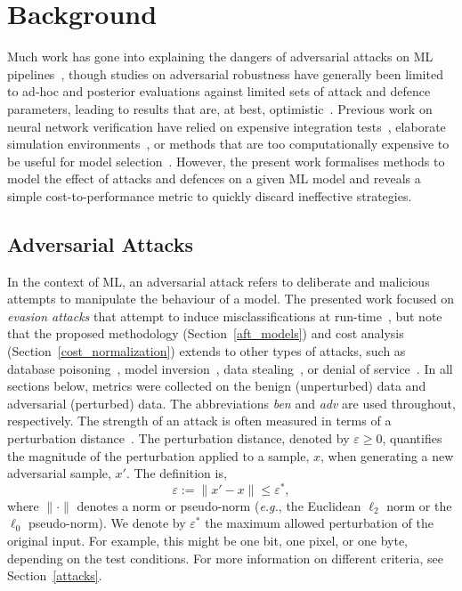 \section{Background}
Much work has gone into explaining the dangers of adversarial attacks on ML pipelines~\cite{carlini_towards_2017,pixelattack,fgm,biggio_evasion_2013}, though studies on adversarial robustness have generally been limited to ad-hoc and posterior evaluations against limited sets of attack and defence parameters, leading to results that are, at best, optimistic~\cite{meyers}.
Previous work on neural network verification have relied on expensive integration tests~\cite{vehicle_testing_review}, elaborate simulation environments~\cite{vehicle_formal}, or methods that are too computationally expensive to be useful for model selection~\cite{formal_adversarial}.
However, the present work formalises methods to model the effect of attacks and defences on a given ML model and reveals a simple cost-to-performance metric to quickly discard ineffective strategies.

\subsection{Adversarial Attacks}
In the context of ML, an adversarial attack refers to deliberate and malicious attempts to manipulate the behaviour of a model.
The presented work focused on \textit{evasion attacks} that attempt to induce misclassifications at run-time~\cite{carlini_towards_2017,biggio_evasion_2013}, but note that the proposed methodology (Section~\ref{aft_models}) and cost analysis (Section~\ref{cost_normalization}) extends to other types of attacks, such as database poisoning~\cite{biggio_poisoning_2013,saha2020hidden}, model inversion~\cite{choquette2021label,li2021membership}, data stealing~\cite{orekondy2019knockoff}, or denial of service~\cite{santos2021universal}.
In all sections below, metrics were collected on the benign (unperturbed) data and adversarial (perturbed) data. The abbreviations \textit{ben} and \textit{adv} are used throughout, respectively.
The strength of an attack is often measured in terms of a perturbation distance~\cite{chakraborty_adversarial_2018,pixelattack}. The perturbation distance, denoted by $\varepsilon\geq0$, quantifies the magnitude of the perturbation applied to a sample, $x$, when generating a new adversarial sample, $x'$. The definition is,
\begin{equation}
    \varepsilon := \| x' - x \| \leq \varepsilon^*,
    \label{eq:perturbation_distance}
\end{equation}
where $\| \cdot \|$ denotes a norm or pseudo-norm (\textit{e.g.}, the Euclidean $\ell_2$ norm or the $\ell_0$ pseudo-norm).
We denote by $\varepsilon^*$ the maximum allowed perturbation of the original input. For example, this might be one bit, one pixel, or one byte, depending on the test conditions.
For more information on different criteria, see Section~\ref{attacks}.


